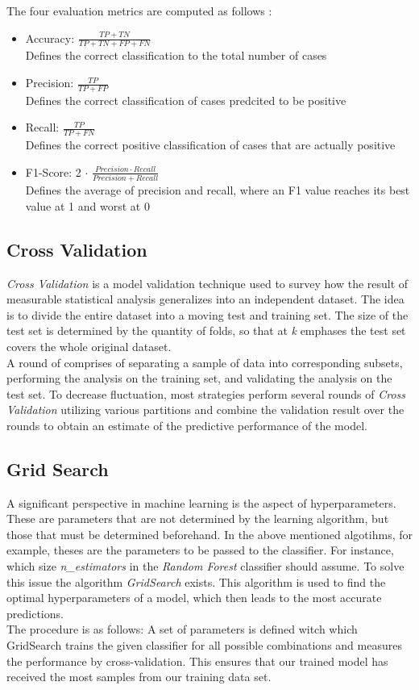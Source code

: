 \documentclass[a4paper, 11pt,titlepage,oneside,openany]{book}
\begin{document}
\noindent The four evaluation metrics are computed as follows \cite{algorithms}:
\begin{itemize}
	\item Accuracy: $\frac{TP+TN}{TP+TN+FP+FN}$\\
					Defines the correct classification to the total number of cases
	\item Precision: $\frac{TP}{TP+FP}$\\
	Defines the correct classification of cases predcited to be positive
	\item Recall: $\frac{TP}{TP+FN}$\\
	Defines the correct positive classification of cases that are actually positive
	\item F1-Score: 2 $\cdot$ $\frac{Precision \cdot Recall}{Precision+Recall}$\\
	Defines the average of precision and recall,
	where an F1 value reaches its best value at 1
	and worst at 0
\end{itemize}\newpage
\subsection{Cross Validation}
\textit{Cross Validation} is a model validation technique used to survey how the result of measurable statistical analysis generalizes into an independent dataset. The idea is to divide the entire dataset into a moving test and training set. The size of the test set is determined by the quantity of folds, so that at \textit{k} emphases the test set covers the whole original dataset.\\
\noindent A round of  comprises of separating a sample of data into corresponding subsets, performing the analysis on the training set, and validating the analysis on the test set. To decrease fluctuation, most strategies perform several rounds of \textit{Cross Validation} utilizing various partitions and combine the validation result over the rounds to obtain an estimate of the predictive performance of the model.

\subsection{Grid Search}
A significant perspective in machine learning is the aspect of hyperparameters. These are parameters that are not determined by the learning algorithm, but those that must be determined beforehand. In the above mentioned algotihms, for example, theses are the parameters to be passed to the classifier. For instance, which size \textit{n\_estimators} in the \textit{Random Forest} classifier should assume. To solve this issue the algorithm \textit{GridSearch} exists. This algorithm is used to find the optimal hyperparameters of a model, which then leads to the most accurate predictions. \\
\noindent The procedure is as follows: A set of parameters is defined witch which GridSearch trains the given classifier for all possible combinations and measures the performance by cross-validation. This ensures that our trained model has received the most samples from our training data set. 
\end{document}
